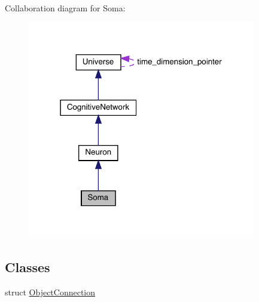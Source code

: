 Collaboration diagram for Soma\+:
\nopagebreak
\begin{figure}[H]
\begin{center}
\leavevmode
\includegraphics[width=283pt]{class_soma__coll__graph}
\end{center}
\end{figure}
\subsection*{Classes}
\begin{DoxyCompactItemize}
\item 
struct \hyperlink{struct_soma_1_1_object_connection}{Object\+Connection}
\end{DoxyCompactItemize}
